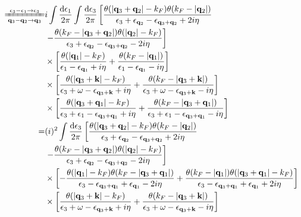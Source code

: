 \[ \begin{split} \xlongequal[\mathbf{q}_3-\mathbf{q}_2 \rightarrow \mathbf{q}_3]{\epsilon_3-\epsilon_1 \rightarrow \epsilon_3} &
i \int \frac{\mathrm{d}\epsilon_1}{2\pi} \int \frac{\mathrm{d}\epsilon_3}{2\pi}
\left[ \frac{\theta(|\mathbf{q}_3+\mathbf{q}_2|-k_F)\theta(k_F-|\mathbf{q}_2|)}{\epsilon_3+\epsilon_{\mathbf{q}_2}-\epsilon_{\mathbf{q}_3+\mathbf{q}_2}+2i \eta} \right. \\
& \left. - \frac{\theta(k_F-|\mathbf{q}_3+\mathbf{q}_2|)\theta(|\mathbf{q}_2|-k_F)}{\epsilon_3+\epsilon_{\mathbf{q}_2}-\epsilon_{\mathbf{q}_3+\mathbf{q}_2}-2i \eta} \right] \\
& \times \left[ \frac{\theta(|\mathbf{q}_1|-k_F)}{\epsilon_1-\epsilon_{\mathbf{q}_1}+i \eta} + \frac{\theta(k_F-|\mathbf{q}_1|)}{\epsilon_1-\epsilon_{\mathbf{q}_1}-i \eta} \right]\\
& \times \left[ \frac{\theta(|\mathbf{q}_3+\mathbf{k}|-k_F)}{\epsilon_3+\omega-\epsilon_{\mathbf{q}_3+\mathbf{k}}+i \eta} + \frac{\theta(k_F-|\mathbf{q}_3+\mathbf{k}|)}{\epsilon_3+\omega-\epsilon_{\mathbf{q}_3+\mathbf{k}}-i \eta} \right]\\
& \times \left[ \frac{\theta(|\mathbf{q}_3+\mathbf{q}_1|-k_F)}{\epsilon_3+\epsilon_1-\epsilon_{\mathbf{q}_3+\mathbf{q}_1}+i \eta} + \frac{\theta(k_F-|\mathbf{q}_3+\mathbf{q}_1|)}{\epsilon_3+\epsilon_1-\epsilon_{\mathbf{q}_3+\mathbf{q}_1}-i \eta} \right] \\
=& (i)^2 \int \frac{\mathrm{d}\epsilon_3}{2\pi}
\left[ \frac{\theta(|\mathbf{q}_3+\mathbf{q}_2|-k_F)\theta(k_F-|\mathbf{q}_2|)}{\epsilon_3+\epsilon_{\mathbf{q}_2}-\epsilon_{\mathbf{q}_3+\mathbf{q}_2}+2i \eta} \right. \\
& \left. - \frac{\theta(k_F-|\mathbf{q}_3+\mathbf{q}_2|)\theta(|\mathbf{q}_2|-k_F)}{\epsilon_3+\epsilon_{\mathbf{q}_2}-\epsilon_{\mathbf{q}_3+\mathbf{q}_2}-2i \eta} \right] \\
& \times \left[ -\frac{\theta(|\mathbf{q}_1|-k_F)\theta(k_F-|\mathbf{q}_3+\mathbf{q}_1|)}{\epsilon_3-\epsilon_{\mathbf{q}_3+\mathbf{q}_1}+\epsilon_{\mathbf{q}_1}-2i\eta} + \frac{\theta(k_F-|\mathbf{q}_1|)\theta(|\mathbf{q}_3+\mathbf{q}_1|-k_F)}{\epsilon_3-\epsilon_{\mathbf{q}_3+\mathbf{q}_1}+\epsilon_{\mathbf{q}_1}+2i\eta} \right] \\
& \times \left[ \frac{\theta(|\mathbf{q}_3+\mathbf{k}|-k_F)}{\epsilon_3+\omega-\epsilon_{\mathbf{q}_3+\mathbf{k}}+i \eta} + \frac{\theta(k_F-|\mathbf{q}_3+\mathbf{k}|)}{\epsilon_3+\omega-\epsilon_{\mathbf{q}_3+\mathbf{k}}-i \eta} \right]
\end{split} \]


